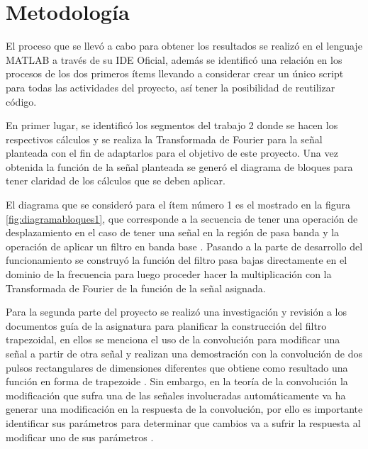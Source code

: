 \section{Metodología}\label{sec:metodologia}
El proceso que se llevó a cabo para obtener los resultados se realizó en el lenguaje MATLAB a través de su IDE Oficial, además se identificó una relación en los procesos de los dos primeros ítems llevando a considerar crear un único script para todas las actividades del proyecto, así tener la posibilidad de reutilizar código.

En primer lugar, se identificó los segmentos del trabajo 2 donde se hacen los respectivos cálculos y se realiza la Transformada de Fourier para la señal planteada con el fin de adaptarlos para el objetivo de este proyecto. Una vez obtenida la función de la señal planteada se generó el diagrama de bloques para tener claridad de los cálculos que se deben aplicar.


\vspace{-5mm}

El diagrama que se consideró para el ítem número 1 es el mostrado en la figura \ref{fig:diagramabloques1}, que corresponde a la secuencia de tener una operación de desplazamiento en el caso de tener una señal en la región de pasa banda y la operación de aplicar un filtro en banda base \cite{filtros2021}. Pasando a la parte de desarrollo del funcionamiento se construyó la función del filtro pasa bajas directamente en el dominio de la frecuencia para luego proceder hacer la multiplicación con la Transformada de Fourier de la función de la señal asignada.

Para la segunda parte del proyecto se realizó una investigación y revisión a los documentos guía de la asignatura para planificar la construcción del filtro trapezoidal, en ellos se menciona el uso de la convolución para modificar una señal a partir de otra señal y realizan una demostración con la convolución de dos pulsos rectangulares de dimensiones diferentes que obtiene como resultado una función en forma de trapezoide \cite{ejercicio2021}. Sin embargo, en la teoría de la convolución la modificación que sufra una de las señales involucradas automáticamente va ha generar una modificación en la respuesta de la convolución, por ello es importante identificar sus parámetros para determinar que cambios va a sufrir la respuesta al modificar uno de sus parámetros \cite{Chaparro2013}.


\vspace{-5mm}

